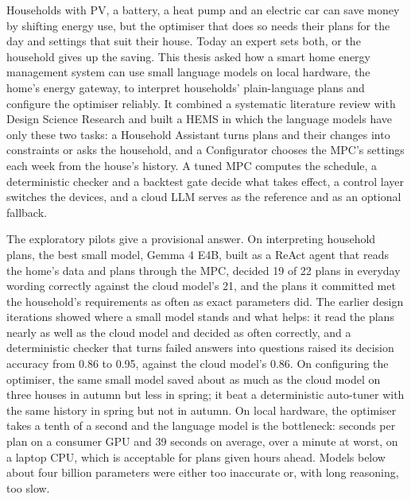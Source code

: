 \documentclass[12pt,a4paper]{report}
\begin{document}
Households with PV, a battery, a heat pump and an electric car can save
money by shifting energy use, but the optimiser that does so needs
their plans for the day and settings that suit their house. Today an
expert sets both, or the household gives up the saving. This thesis
asked how a smart home energy management system can use small language
models on local hardware, the home's energy gateway, to interpret
households' plain-language plans and configure the optimiser reliably.
It combined a
systematic literature review with Design Science Research and built a
HEMS in which the language models have only these two tasks: a
Household Assistant turns plans and their changes into constraints or
asks the household, and a Configurator chooses the MPC's settings each
week from the house's history. A tuned MPC computes the schedule, a
deterministic checker and a backtest gate decide what takes effect, a
control layer switches the devices, and a cloud LLM serves as the
reference and as an optional fallback.

The exploratory pilots give a provisional answer. On interpreting
household plans, the best small model, Gemma 4 E4B, built as a ReAct
agent that reads the home's data and plans through the MPC, decided 19
of 22 plans in everyday wording correctly against the cloud model's 21,
and the plans it committed met the household's requirements as often
as exact parameters did. The earlier design iterations showed where a
small model stands and what helps: it read the plans nearly as well as
the cloud model and decided as often correctly, and a deterministic
checker that turns failed answers into questions raised its decision
accuracy from 0.86 to 0.95, against the cloud model's 0.86. On configuring the
optimiser, the same small model saved about as much as the cloud model
on three houses in autumn but less in spring; it beat a deterministic
auto-tuner with the same history in spring but not in autumn. On local hardware, the optimiser takes a tenth of a
second and the language model is the bottleneck: seconds per plan on a
consumer GPU and 39 seconds on average, over a minute at worst, on a
laptop CPU, which is acceptable for
plans given hours ahead. Models below about four billion parameters
were either too inaccurate or, with long reasoning, too slow.
\end{document}
